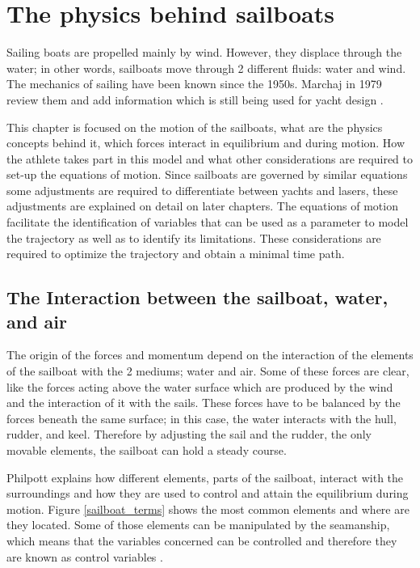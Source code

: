 \chapter{The physics behind sailboats}

Sailing boats are propelled mainly by wind. However, they displace through the water; in other words, sailboats move through 2 different fluids: water and wind. The mechanics of sailing have been known since the 1950s. Marchaj in 1979 review them and add information which is still being used for yacht design \cite{marchajaereo1979}.\par 

This chapter is focused on the motion of the sailboats, what are the physics concepts behind it, which forces interact in equilibrium and during motion. How the athlete takes part in this model and what other considerations are required to set-up the equations of motion. Since sailboats are governed by similar equations some adjustments are required to differentiate between yachts and lasers, these adjustments are explained on detail on later chapters. The equations of motion facilitate the identification of variables that can be used as a parameter to model the trajectory as well as to identify its limitations. These considerations are required to optimize the trajectory and obtain a minimal time path. \par
\section{The Interaction between the sailboat, water, and air} \label{sec:interaction_boat_environ}
The origin of the forces and momentum depend on the interaction of the elements of the sailboat with the 2 mediums; water and air. Some of these forces are clear, like the forces acting above the water surface which are produced by the wind and the interaction of it with the sails. These forces have to be balanced by the forces beneath the same surface; in this case, the water interacts with the hull, rudder, and keel. Therefore by adjusting the sail and the rudder, the only movable elements, the sailboat can hold a steady course.\par

Philpott explains how different elements, parts of the sailboat, interact with the surroundings and how they are used to control and attain the equilibrium during motion. Figure \ref{sailboat_terms} shows the most common elements and where are they located. Some of those elements can be manipulated by the seamanship, which means that the variables concerned can be controlled and therefore they are known as control variables \cite{philpott1993yacht}. \par

